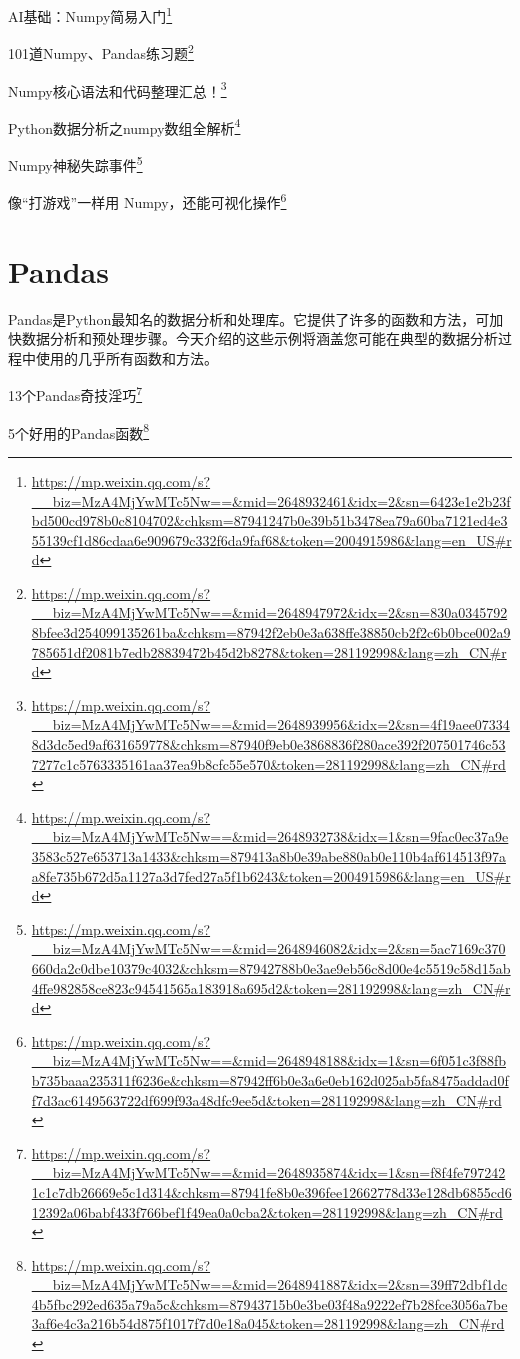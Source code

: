 \documentclass[]{ctexbook}
\renewcommand{\href}[2]{#2\footnote{\url{#1}}}
\begin{document}
\href{https://mp.weixin.qq.com/s?__biz=MzA4MjYwMTc5Nw==\&mid=2648932461\&idx=2\&sn=6423e1e2b23fbd500cd978b0c8104702\&chksm=87941247b0e39b51b3478ea79a60ba7121ed4e355139cf1d86cdaa6e909679c332f6da9faf68\&token=2004915986\&lang=en_US\#rd}{AI基础：Numpy简易入门}

\href{https://mp.weixin.qq.com/s?__biz=MzA4MjYwMTc5Nw==\&mid=2648947972\&idx=2\&sn=830a03457928bfee3d254099135261ba\&chksm=87942f2eb0e3a638ffe38850cb2f2c6b0bce002a9785651df2081b7edb28839472b45d2b8278\&token=281192998\&lang=zh_CN\#rd}{101道Numpy、Pandas练习题}

\href{https://mp.weixin.qq.com/s?__biz=MzA4MjYwMTc5Nw==\&mid=2648939956\&idx=2\&sn=4f19aee073348d3dc5ed9af631659778\&chksm=87940f9eb0e3868836f280ace392f207501746c537277c1c5763335161aa37ea9b8cfc55e570\&token=281192998\&lang=zh_CN\#rd}{Numpy核心语法和代码整理汇总！}

\href{https://mp.weixin.qq.com/s?__biz=MzA4MjYwMTc5Nw==\&mid=2648932738\&idx=1\&sn=9fac0ec37a9e3583c527e653713a1433\&chksm=879413a8b0e39abe880ab0e110b4af614513f97aa8fe735b672d5a1127a3d7fed27a5f1b6243\&token=2004915986\&lang=en_US\#rd}{Python数据分析之numpy数组全解析}

\href{https://mp.weixin.qq.com/s?__biz=MzA4MjYwMTc5Nw==\&mid=2648946082\&idx=2\&sn=5ac7169c370660da2c0dbe10379c4032\&chksm=87942788b0e3ae9eb56c8d00e4c5519c58d15ab4ffe982858ce823c94541565a183918a695d2\&token=281192998\&lang=zh_CN\#rd}{Numpy神秘失踪事件}

\href{https://mp.weixin.qq.com/s?__biz=MzA4MjYwMTc5Nw==\&mid=2648948188\&idx=1\&sn=6f051c3f88fbb735baaa235311f6236e\&chksm=87942ff6b0e3a6e0eb162d025ab5fa8475addad0ff7d3ac6149563722df699f93a48dfc9ee5d\&token=281192998\&lang=zh_CN\#rd}{像``打游戏''一样用 Numpy，还能可视化操作}

\hypertarget{pandas}{%
\section{Pandas}\label{pandas}}

Pandas是Python最知名的数据分析和处理库。它提供了许多的函数和方法，可加快数据分析和预处理步骤。今天介绍的这些示例将涵盖您可能在典型的数据分析过程中使用的几乎所有函数和方法。

\href{https://mp.weixin.qq.com/s?__biz=MzA4MjYwMTc5Nw==\&mid=2648935874\&idx=1\&sn=f8f4fe7972421c1c7db26669e5c1d314\&chksm=87941fe8b0e396fee12662778d33e128db6855cd612392a06babf433f766bef1f49ea0a0cba2\&token=281192998\&lang=zh_CN\#rd}{13个Pandas奇技淫巧}

\href{https://mp.weixin.qq.com/s?__biz=MzA4MjYwMTc5Nw==\&mid=2648941887\&idx=2\&sn=39ff72dbf1dc4b5fbc292ed635a79a5c\&chksm=87943715b0e3be03f48a9222ef7b28fce3056a7be3af6e4c3a216b54d875f1017f7d0e18a045\&token=281192998\&lang=zh_CN\#rd}{5个好用的Pandas函数}
\end{document}
